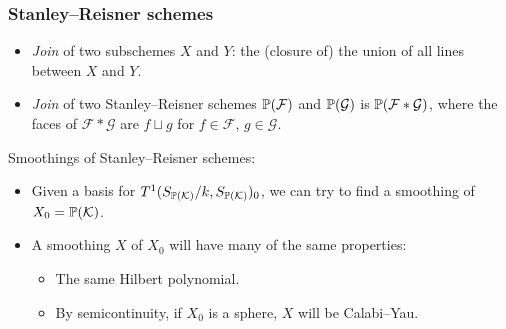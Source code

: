 \begin{frame}
\frametitle{Stanley--Reisner schemes}

\begin{itemize}
	\item \emph{Join} of two subschemes $X$ and $Y$: the (closure of) the union of all lines between $X$ and $Y$.
	\item \emph{Join} of two Stanley--Reisner schemes $\P(\mathcal F)$ and $\P(\mathcal G)$ is $\P(\mathcal F \ast \mathcal G)$, where the faces of $\mathcal F  \ast \mathcal G$ are $f \sqcup g$ for $f \in \mathcal F$, $g \in \mathcal G$.
\end{itemize}

\pause

Smoothings of Stanley--Reisner schemes: \pause

\begin{itemize}
	\item Given a basis for $T^1(S_{\P(\mathcal K)}/k,S_{\P(\mathcal K)})_0$, we can try to find a smoothing of $X_0 = \P(\mathcal K)$.
	\item A smoothing $X$ of $X_0$ will have many of the same properties:
		\begin{itemize}
			\item The same Hilbert polynomial.
			\item By semicontinuity, if $X_0$ is a sphere, $X$ will be Calabi--Yau. %
		\end{itemize}
\end{itemize}


\end{frame}